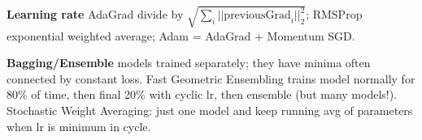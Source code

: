 \textbf{Learning rate} AdaGrad divide by $\sqrt{\sum_i ||\text{previousGrad}_i||_2^2}$; RMSProp exponential weighted average; Adam = AdaGrad + Momentum SGD.

\textbf{Bagging/Ensemble} models trained separately; they have minima often connected by constant loss. Fast Geometric Ensembling trains model normally for 80\% of time, then final 20\% with cyclic lr, then ensemble (but many models!). Stochastic Weight Averaging: just one model and keep running avg of parameters when lr is minimum in cycle.
